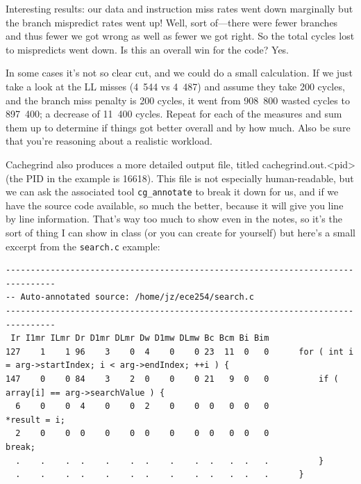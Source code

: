 \documentclass[a4paper]{report}
\begin{document}
Interesting results: our data and instruction miss rates went down marginally but the branch mispredict rates went up! Well, sort of---there were fewer branches and thus fewer we got wrong as well as fewer we got right. So the total cycles lost to mispredicts went down. Is this an overall win for the code? Yes. 

In some cases it's not so clear cut, and we could do a small calculation. If we just take a look at the LL misses (4~544 vs 4~487) and assume they take 200 cycles, and the branch miss penalty is 200 cycles, it went from 908~800 wasted cycles to 897~400; a decrease of 11~400 cycles. Repeat for each of the measures and sum them up to determine if things got better overall and by how much. Also be sure that you're reasoning about a realistic workload.

Cachegrind also produces a more detailed output file, titled cachegrind.out.<pid> (the PID in the example is 16618). This file is not especially human-readable, but we can ask the associated tool \texttt{cg\_annotate} to break it down for us, and if we have the source code available, so much the better, because it will give you line by line information. That's way too much to show even in the notes, so it's the sort of thing I can show in class (or you can create for yourself) but here's a small excerpt from the \texttt{search.c} example:



{\scriptsize
\begin{verbatim}
--------------------------------------------------------------------------------
-- Auto-annotated source: /home/jz/ece254/search.c
--------------------------------------------------------------------------------
 Ir I1mr ILmr Dr D1mr DLmr Dw D1mw DLmw Bc Bcm Bi Bim 
127    1    1 96    3    0  4    0    0 23  11  0   0      for ( int i = arg->startIndex; i < arg->endIndex; ++i ) {
147    0    0 84    3    2  0    0    0 21   9  0   0          if ( array[i] == arg->searchValue ) {
  6    0    0  4    0    0  2    0    0  0   0  0   0              *result = i;
  2    0    0  0    0    0  0    0    0  0   0  0   0              break;
  .    .    .  .    .    .  .    .    .  .   .  .   .          }
  .    .    .  .    .    .  .    .    .  .   .  .   .      }
\end{verbatim}
}
\end{document}
